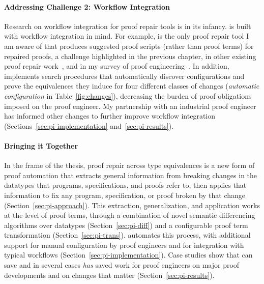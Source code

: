 \paragraph{Addressing Challenge 2: Workflow Integration}
Research on workflow integration for proof repair tools is in its infancy.
\toolnamec is built with workflow integration in mind.
For example, \toolnamec is the only proof repair tool I am aware of that produces suggested proof scripts (rather than proof terms) for repaired proofs,
a challenge highlighted in the previous chapter, in other existing proof repair work~\cite{robert2018}, and in 
my survey of proof engineering~\cite{PGL-045}.
In addition, \toolnamec implements search procedures that 
automatically discover configurations and prove the equivalences they induce for four different classes of 
changes (\textit{automatic configuration} in Table~\ref{fig:changes}),
decreasing the burden of proof obligations imposed on the proof engineer.
My partnership with an industrial proof engineer has informed other changes to further improve workflow integration
(Sections~\ref{sec:pi-implementation} and~\ref{sec:pi-results}).

\paragraph{Bringing it Together}
In the frame of the thesis, proof repair across type equivalences is a new form of proof automation that extracts general information from breaking 
changes in the datatypes that programs, specifications, and proofs refer to, 
then applies that information to fix any program, specification, or proof broken by that change (Section~\ref{sec:pi-approach}).
This extraction, generalization, and application works at the level of proof terms, through a combination of novel semantic differencing algorithms over datatypes (Section~\ref{sec:pi-diff}) and a configurable proof term transformation (Section~\ref{sec:pi-trans}).
\toolnamec automates this process,
with additional support for manual configuration by proof engineers and for integration with 
typical  workflows (Section~\ref{sec:pi-implementation}).
Case studies show that \toolnamec can save and in several cases \textit{has} saved work for proof engineers on major proof developments and on
changes that matter (Section~\ref{sec:pi-results}).















